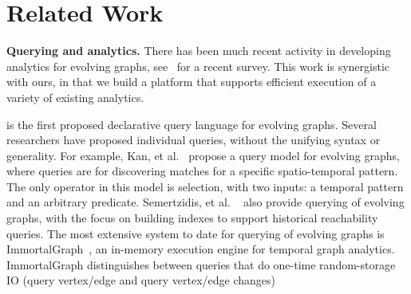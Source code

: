 \section{Related Work}
\label{sec:related}


{\bf Querying and analytics.}  There has been much recent activity in
developing analytics for evolving graphs, see~\cite{} for a recent
survey.  This work is synergistic with ours, in that we build a
platform that supports efficient execution of a variety of existing
analytics.

\ql is the first proposed declarative query language for evolving
graphs.  Several researchers have proposed individual queries, without
the unifying syntax or generality.  For example, Kan, et
al.~\cite{Kan2009} propose a query model for evolving graphs, where
queries are for discovering matches for a specific spatio-temporal
pattern.  The only operator in this model is selection, with two
inputs: a temporal pattern and an arbitrary predicate.   Semertzidis, et
al. ~\cite{Semertzidis2015} also provide querying of evolving graphs,
with the focus on building indexes to support historical reachability
queries.  The most extensive system to date for querying of evolving
graphs is ImmortalGraph~\cite{DBLP:journals/tos/MiaoHLWYZPCC15}, an
in-memory execution engine for temporal graph analytics.
ImmortalGraph distinguishes between queries that do one-time
random-storage IO (query vertex/edge and query vertex/edge changes)
